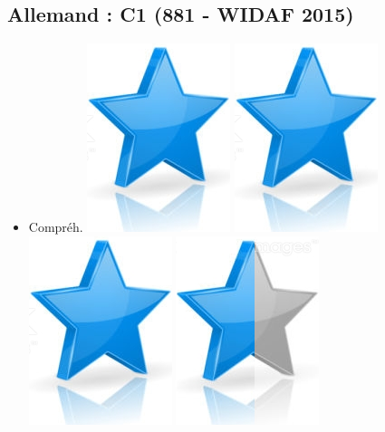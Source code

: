 \documentclass[10pt,a4paper,sans]{article}
\begin{document}
\begin{minipage}[t]{0.26\textwidth}
\begin{mdframed}[style=cadreCompetences]
        \subsection{Allemand : C1 \newline (881 - WIDAF 2015)}
            \begin{itemize}
                \item{Compréh.
                    \hfill
                    \includegraphics[scale=0.20]{img/star.png} \hspace{-0.2cm}
                    \includegraphics[scale=0.20]{img/star.png} \hspace{-0.2cm}
                    \includegraphics[scale=0.20]{img/star.png} \hspace{-0.2cm}
                    \includegraphics[scale=0.20]{img/half_star.png} \hspace{-0.2cm}
}
\end{itemize}
\end{mdframed}
\end{minipage}
\end{document}
